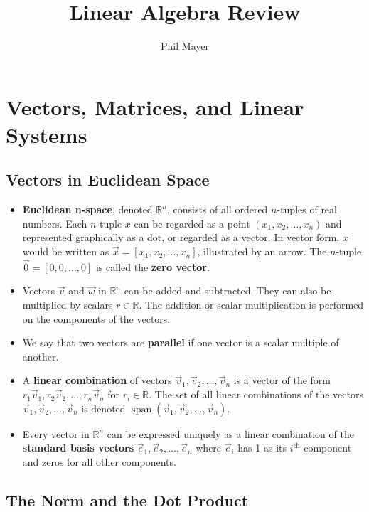 \documentclass[11pt]{amsart}
\title{Linear Algebra Review}
\author{Phil Mayer}
\DeclareMathOperator{\Span}{span}
\newcommand{\reals}{\mathbb{R}}
\begin{document}
\maketitle

\section{Vectors, Matrices, and Linear Systems}
\subsection{Vectors in Euclidean Space}

\begin{itemize}

	\item{
		\textbf{Euclidean n-space}, denoted $\reals^n$, consists of all ordered $n$-tuples of real numbers. Each $n$-tuple $x$ can be
		regarded as a point $(x_1, x_2, \dots, x_n)$ and represented graphically as a dot, or regarded as a vector. In vector form, $x$ would be
		written as $\vec{x} = [ x_1, x_2, \dots, x_n]$, illustrated by an arrow. The $n$-tuple $\vec{0} = [0, 0, \dots, 0]$ is called the  
		\textbf{zero vector}.
	}
	\item{
		Vectors $\vec{v}$ and $\vec{w}$ in $\reals^n$ can be added and subtracted. They can also be multiplied by scalars 
		$r \in \reals$. The addition or scalar multiplication is performed on the components of the vectors.
	}
	\item{
		We say that two vectors are \textbf{parallel} if one vector is a scalar multiple of another.
	}
	\item{
		A \textbf{linear combination} of vectors $\vec{v}_1, \vec{v}_2, \dots, \vec{v}_n$ is a vector of the form 
		$r_1 \vec{v}_1, r_2 \vec{v}_2, \dots, r_n \vec{v}_n$ for $r_i \in \reals$.  The set of all linear combinations of the vectors 
		$\vec{v}_1, \vec{v}_2, \dots, \vec{v}_n$ is denoted $\Span(\vec{v}_1, \vec{v}_2, \dots, \vec{v}_n)$.
	}
	\item{
		Every vector in $\reals^n$ can be expressed uniquely as a linear combination of the \textbf{standard basis vectors} 
		$\vec{e}_1, \vec{e}_2, \dots, \vec{e}_n$ where $\vec{e}_i$ has 1 as its $i^{\text{th}}$ component and zeros for all other components.
	}
\end{itemize}

\subsection{The Norm and the Dot Product}
\end{document}

